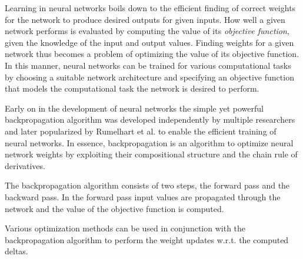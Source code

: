 Learning in neural networks boils down to the efficient finding of correct weights for the network to produce desired outputs for given inputs. How well a given network performs is evaluated by computing the value of its \textit{objective function}, given the knowledge of the input and output values. Finding weights for a given network thus becomes a problem of optimizing the value of its objective function. In this manner, neural networks can be trained for various computational tasks by choosing a suitable network architecture and specifying an objective function that models the computational task the network is desired to perform.

Early on in the development of neural networks the simple yet powerful backpropagation algorithm was developed independently by multiple researchers and later popularized by Rumelhart et al. \cite{nature_backprop} to enable the efficient training of neural networks. In essence, backpropagation is an algorithm to optimize neural network weights by exploiting their compositional structure and the chain rule of derivatives.

The backpropagation algorithm consists of two steps, the forward pass and the backward pass. In the forward pass input values are propagated through the network and the value of the objective function is computed. 

Various optimization methods can be used in conjunction with the backpropagation algorithm to perform the weight updates w.r.t. the computed deltas. 



